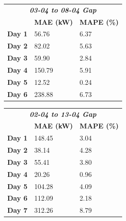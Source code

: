 \begin{table}[H]
	\begin{minipage}[t]{.45\textwidth}
		\begin{center}
			\begin{tabular}[c]{l|l|l}
				\multicolumn{3}{c}{\textbf{\textit{03-04 to 08-04 Gap}}}       \\
				               & \multicolumn{1}{c|}{\textbf{MAE (kW)}} &
				\multicolumn{1}{c}{\textbf{MAPE (\%)}}                         \\
				\hline
				\textbf{Day 1} & 56.76                                  & 6.37 \\
				\textbf{Day 2} & 82.02                                  & 5.63 \\
				\textbf{Day 3} & 59.90                                  & 2.84 \\
				\textbf{Day 4} & 150.79                                 & 5.91 \\
				\textbf{Day 5} & 12.52                                  & 0.24 \\
				\textbf{Day 6} & 238.88                                 & 6.73
			\end{tabular}
		\end{center}
	\end{minipage}%
	\hfill
	\begin{minipage}[t]{.45\textwidth}
		\begin{center}
			\begin{tabular}[c]{l|l|l}
				\multicolumn{3}{c}{\textbf{\textit{02-04 to 13-04 Gap}}}        \\
				                & \multicolumn{1}{c|}{\textbf{MAE (kW)}} &
				\multicolumn{1}{c}{\textbf{MAPE (\%)}}                          \\
				\hline
				\textbf{Day 1}  & 148.45                                 & 3.04 \\
				\textbf{Day 2}  & 38.14                                  & 4.28 \\
				\textbf{Day 3}  & 55.41                                  & 3.80 \\
				\textbf{Day 4}  & 20.26                                  & 0.96 \\
				\textbf{Day 5}  & 104.28                                 & 4.09 \\
				\textbf{Day 6}  & 112.09                                 & 2.18 \\
				\textbf{Day 7}  & 312.26                                 & 8.79 \\

\end{tabular}
\end{center}
\end{minipage}
\end{table}

